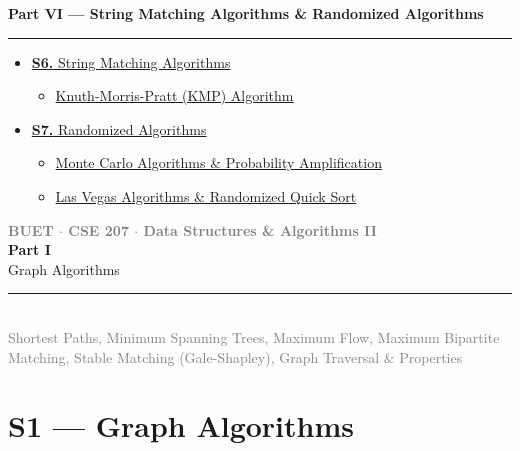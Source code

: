 \documentclass[12pt]{article}
\newcommand{\secdivider}[5]{%
  \newpage\thispagestyle{empty}%
  \vspace*{\fill}%
  \begin{tcolorbox}[enhanced,colback=#4!7,colframe=#3,boxrule=1.5pt,arc=8pt,
    left=20pt,right=20pt,top=22pt,bottom=22pt,
    shadow={3pt}{-3pt}{0pt}{black!15}]
    \centering
    {\large\textcolor{gray}{\textbf{BUET $\cdot$ CSE 207 $\cdot$ Data Structures \& Algorithms II}}}\\[8pt]
    {\fontsize{26}{32}\selectfont\bfseries\textcolor{#3}{#1}}\\[6pt]
    {\fontsize{15}{19}\selectfont\textcolor{dgray}{#2}}\\[12pt]
    \textcolor{#3!60}{\rule{0.5\textwidth}{0.5pt}}\\[6pt]
    {\small\textcolor{gray}{#5}}
  \end{tcolorbox}%
  \vspace*{\fill}\newpage%
}
\begin{document}
\begin{tcolorbox}[breakable,colback=cG!5,colframe=cG,boxrule=1pt,arc=5pt,
  left=8pt,right=8pt,top=8pt,bottom=8pt,before skip=4pt]
  {\large\bfseries\textcolor{cG}{Part VI --- String Matching Algorithms \& Randomized Algorithms}}\par\smallskip
  \noindent\textcolor{cF!40}{\rule{\textwidth}{0.4pt}}\par\smallskip
  \small\begin{itemize}[leftmargin=1.2em,itemsep=1pt,label={\textcolor{cG}{$\triangleright$}}]
    \item \hyperref[sec:S6]{\textbf{S6.} String Matching Algorithms}
      \begin{itemize}[leftmargin=1.5em,itemsep=0pt,label={\textcolor{cG}{$\cdot$}}]
        \item \hyperref[sub:s6-kmp]{Knuth-Morris-Pratt (KMP) Algorithm}
      \end{itemize}
  \end{itemize}
    \small\begin{itemize}[leftmargin=1.2em,itemsep=1pt,label={\textcolor{cG}{$\triangleright$}}]
    \item \hyperref[sec:S7]{\textbf{S7.} Randomized Algorithms}
      \begin{itemize}[leftmargin=1.5em,itemsep=0pt,label={\textcolor{cG}{$\cdot$}}]
        \item \hyperref[sub:s7-montecarlo]{Monte Carlo Algorithms \& Probability Amplification}
        \item \hyperref[sub:s7-lasvegas]{Las Vegas Algorithms \& Randomized Quick Sort}
      \end{itemize}
  \end{itemize}
\end{tcolorbox}




\newpage

\secdivider{Part I}{Graph Algorithms}{cA}{cA}{Shortest Paths, Minimum Spanning Trees, Maximum Flow, Maximum Bipartite Matching, Stable Matching (Gale-Shapley), Graph Traversal \& Properties}

\section{S1 --- Graph Algorithms}
\label{sec:S1}
\end{document}
